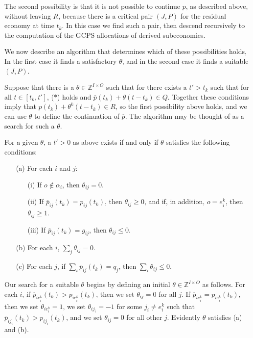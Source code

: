 \documentclass[12pt]{article}
\theoremstyle{definition}
\newcommand{\In}{\mathbb{Z}}
\newcommand{\barp}{\overline{p}}
\begin{document}
\begin{appendix}
The second possibility is that it is not possible to continue $p$, as
described above, without leaving $R$, because there is a critical pair
$(J,P)$ for the residual economy at time $t_k$.  In this case we find
such a pair, then descend recursively to the computation of the GCPS
allocations of derived subeconomies.

We now describe an algorithm that determines which of these
possibilities holds, In the first case it finds a satisfactory
$\theta$, and in the second case it finds a suitable $(J,P)$.

Suppose that there is a $\theta \in \In^{I \times O}$ such that for
there exists a $t' > t_k$ such that for all $t \in [t_k,t']$, ($*$)
holds and $\barp(t_k) + \theta(t - t_k) \in Q$.  Together these
conditions imply that $p(t_k) + \theta^k(t - t_k) \in R$, so the first
possibility above holds, and we can use $\theta$ to define the
continuation of $\barp$.  The algorithm may be thought of as a search
for such a $\theta$.

For a given $\theta$, a $t' > 0$ as above exists if and only if
$\theta$ satisfies the following conditions:
\begin{enumerate} 
  \item[(a)] For each $i$ and $j$:
    \begin{enumerate}
      \item[(i)] If $o \notin \alpha_i$, then $\theta_{ij} = 0$.
      \item[(ii)] If $\barp_{ij}(t_k) = p_{ij}(t_k)$, then $\theta_{ij} \ge 0$, and if, in addition, $o = e^k_i$, then $\theta_{ij} \ge 1$.
      \item[(iii)] If $\barp_{ij}(t_k) = g_{ij}$, then $\theta_{ij} \le 0$.
    \end{enumerate}
  \item[(b)] For each $i$, $\sum_j \theta_{ij} = 0$.
  \item[(c)] For each $j$, if $\sum_i \barp_{ij}(t_k) = q_j$, then $\sum_i \theta_{ij} \le 0$.
\end{enumerate}


Our search for a suitable $\theta$ begins by defining an initial
$\theta \in \In^{I \times O}$ as follows.  For each $i$, if
$\barp_{ie^k_i}(t_k) > p_{ie^k_i}(t_k)$, then we set $\theta_{ij} = 0$
for all $j$.  If $\barp_{ie^k_i} = p_{ie^k_i}(t_k)$, then we set
$\theta_{ie^k_i} = 1$, we set $\theta_{ij_i} = -1$ for some $j_i \ne
e^k_i$ such that $\barp_{ij_i}(t_k) > p_{ij_i}(t_k)$, and we set
$\theta_{ij} = 0$ for all other $j$.  Evidently $\theta$ satisfies (a)
and (b).


\end{appendix}
\end{document}
